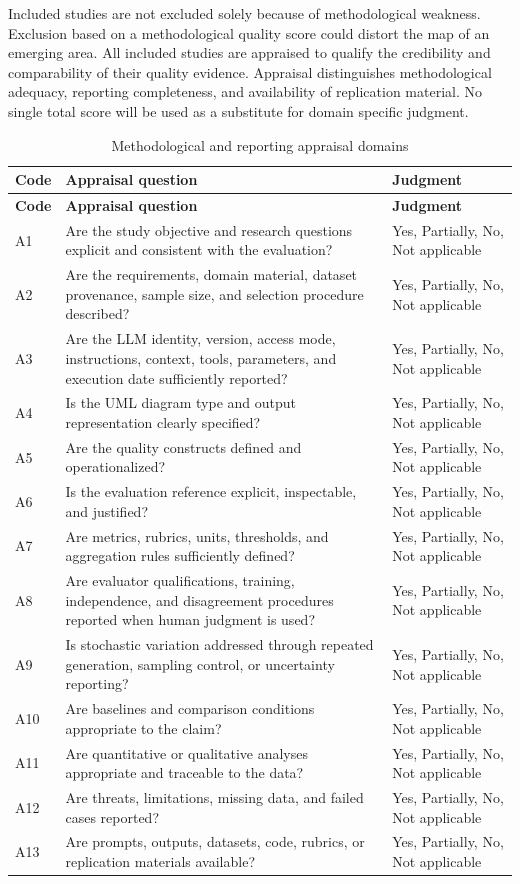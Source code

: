 Included studies are not excluded solely because of methodological weakness. Exclusion based on a methodological quality score could distort the map of an emerging area. All included studies are appraised to qualify the credibility and comparability of their quality evidence. Appraisal distinguishes methodological adequacy, reporting completeness, and availability of replication material. No single total score will be used as a substitute for domain specific judgment.

\begin{longtable}{p{} p{} p{}}
\caption{Methodological and reporting appraisal domains}
\label{tab:protocol_appraisal}\\
\toprule
\textbf{Code} & \textbf{Appraisal question} & \textbf{Judgment} \\
\midrule
\endfirsthead
\toprule
\textbf{Code} & \textbf{Appraisal question} & \textbf{Judgment} \\
\midrule
\endhead
A1 & Are the study objective and research questions explicit and consistent with the evaluation? & Yes, Partially, No, Not applicable \\
A2 & Are the requirements, domain material, dataset provenance, sample size, and selection procedure described? & Yes, Partially, No, Not applicable \\
A3 & Are the LLM identity, version, access mode, instructions, context, tools, parameters, and execution date sufficiently reported? & Yes, Partially, No, Not applicable \\
A4 & Is the UML diagram type and output representation clearly specified? & Yes, Partially, No, Not applicable \\
A5 & Are the quality constructs defined and operationalized? & Yes, Partially, No, Not applicable \\
A6 & Is the evaluation reference explicit, inspectable, and justified? & Yes, Partially, No, Not applicable \\
A7 & Are metrics, rubrics, units, thresholds, and aggregation rules sufficiently defined? & Yes, Partially, No, Not applicable \\
A8 & Are evaluator qualifications, training, independence, and disagreement procedures reported when human judgment is used? & Yes, Partially, No, Not applicable \\
A9 & Is stochastic variation addressed through repeated generation, sampling control, or uncertainty reporting? & Yes, Partially, No, Not applicable \\
A10 & Are baselines and comparison conditions appropriate to the claim? & Yes, Partially, No, Not applicable \\
A11 & Are quantitative or qualitative analyses appropriate and traceable to the data? & Yes, Partially, No, Not applicable \\
A12 & Are threats, limitations, missing data, and failed cases reported? & Yes, Partially, No, Not applicable \\
A13 & Are prompts, outputs, datasets, code, rubrics, or replication materials available? & Yes, Partially, No, Not applicable \\
\bottomrule
\end{longtable}

